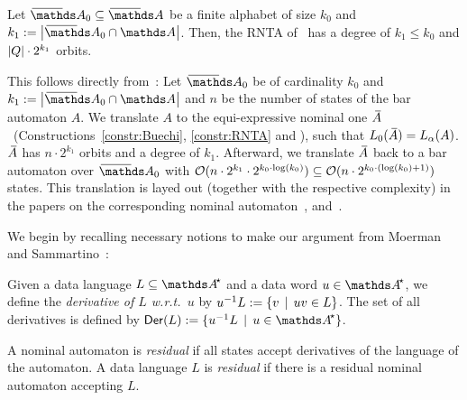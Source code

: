 \documentclass[a4paper,UKenglish,cleveref,autoref,thm-restate,numberwithinsect,final]{lipics-v2021}
\begin{document}
    \begin{rem}
      Let $\barNames_0 \seq \barNames$ be a finite alphabet of size $k_0$ and ${k_1 := \card{\barNames_0 \cap \names}}$.
      Then, the RNTA of~ has a degree of $k_1 \leqslant k_0$ and $\card{Q} \cdot 2^{k_1}$ orbits. 
    \end{rem}


    This follows directly from~: Let $\barNames_0$ be of cardinality $k_0$ and
    $k_1 := \card{\barNames_0 \cap \names}$ and $n$ be the number of states of the bar automaton $A$.
    We translate $A$ to the equi-expressive nominal one $\barA$~(Constructions~\ref{constr:Buechi}, \ref{constr:RNTA} and \cite[Constr.~5.10]{skmw17}), such that $L_0(\barA) = L_\alpha(A)$.
    $\barA$ has $n \cdot 2^{k_1}$ orbits and a degree of $k_1$. Afterward, we translate $\barA$ back
    to a bar automaton over $\barNames_0$ with $\mathcal{O}(n \cdot 2^{k_1} \cdot 2^{k_0 \cdot \log(k_0)})
    \subseteq \mathcal{O}(n \cdot 2^{k_0 \cdot (\log(k_0) + 1)})$ states. This translation is layed out
    (together with the respective complexity) in the papers on the corresponding nominal automaton~\cite[Thm.~5.13]{skmw17},
    \cite[Proof of Thm.~6.2]{uhms21} and~\cite[Proof of Thm.~6.3]{ps24}.
    
      We begin by recalling necessary notions to make our argument from Moerman and Sammartino~\cite{ms22}:

      \begin{defn}
        Given a data language $L \seq \Ats$ and a data word $u \in \Ats$, we define the \emph{derivative of
        $L$ w.r.t.~$u$} by ${u}^{-1}L := \{v\,\mid\,uv \in L\}$. The set of all derivatives is defined by
        $\Der(L) := \setw{\deriv{u}{L}}{u \in \Ats}$.
      \end{defn}
      
      \begin{defn}[{\cite[Defn.~2.7]{ms22}}]
        A nominal automaton is \emph{residual} if all states accept derivatives of the language of the
        automaton. A data language $L$ is \emph{residual} if there is a residual nominal automaton accepting $L$.
      \end{defn}
      
\end{document}
